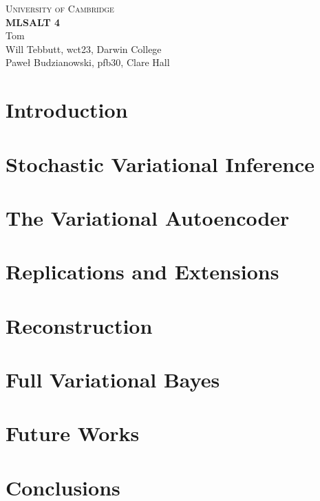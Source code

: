 \documentclass[10pt,a4paper]{article}
\begin{document}
\begin{center}
\Large{\textsc{
University of Cambridge}}\\
\vspace{.5cm}
\large\textbf{MLSALT 4}\\
\vspace{.5cm}
\large{Tom}\\
\large{Will Tebbutt, wct23, Darwin College}\\
\large{Paweł Budzianowski, pfb30, Clare Hall}\\
\end{center} 

\section{Introduction}


\section{Stochastic Variational Inference}


\section{The Variational Autoencoder}


\section{Replications and Extensions}


\section{Reconstruction}


\section{Full Variational Bayes}


\section{Future Works}


\section{Conclusions}


\printbibliography
\end{document}
